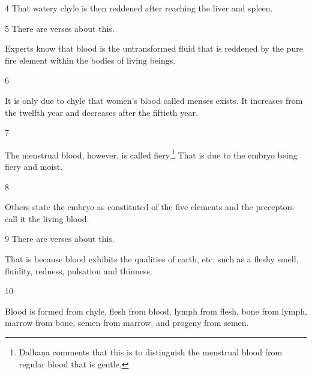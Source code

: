 \begin{translation}
\item [4]  
That watery chyle is then reddened after reaching the liver and spleen.

  
\item [5]
There are verses about this.

\begin{sloka}
Experts know that blood is the untransformed fluid that is reddened by the pure 
fire element within the bodies of living beings.
\end{sloka}

\item [6]

\begin{sloka}
It is only due to chyle that women's blood called menses exists. It increases from the twelfth year and decreases after the fiftieth year. 
\end{sloka}

\item [7]

The menstrual blood, however, is called fiery.\footnote{Ḍalhaṇa comments that 
this is to distinguish the menstrual blood from regular blood that is gentle.}
That is due to the embryo being fiery and moist.


\item [8]

Others state the embryo as constituted of the five elements and the preceptors 
call it the living blood. 

\item [9]
There are verses about this.
\begin{sloka}
That is because blood exhibits the qualities of earth, etc. such as a fleshy smell, 
fluidity, redness, pulsation and thinness.
\end{sloka}

\item [10]

\begin{sloka}
Blood is formed from chyle, flesh from blood, lymph from flesh, bone from lymph, marrow from bone, semen from marrow, and progeny from semen. 
\end{sloka}


\end{translation}
